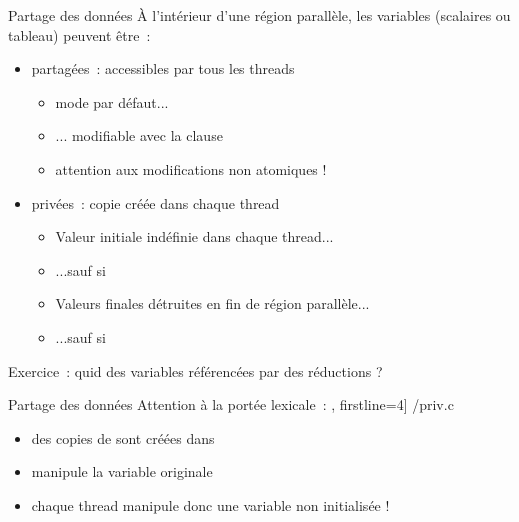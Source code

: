 

\begin {frame} {Partage des données}
    À l'intérieur d'une région parallèle, les variables (scalaires
    ou tableau) peuvent être~:

    \begin {itemize}
	\item partagées~: accessibles par tous les threads


	    \begin {itemize}
		\item mode par défaut...
		\item ... modifiable avec la clause 
		\item attention aux modifications non atomiques !
	    \end {itemize}

	\item privées~: copie créée dans chaque thread


	    \begin {itemize}
		\item Valeur initiale indéfinie dans chaque thread...
		\item ...sauf si 
		\item Valeurs finales détruites en fin de région
		    parallèle...
		\item ...sauf si 
	    \end {itemize}
    \end {itemize}

    Exercice~: quid des variables référencées par des réductions ?
\end {frame}

\begin {frame} [fragile] {Partage des données}
    Attention à la portée lexicale~:
    \scriptsize\lstmonstyle, firstline=4] {\inc/priv.c}

    \begin {itemize}
	\item des copies de  sont créées dans 
	\item {} manipule la variable  originale
	\item chaque thread manipule donc une variable  non
	    initialisée !
    \end {itemize}
\end{frame}

